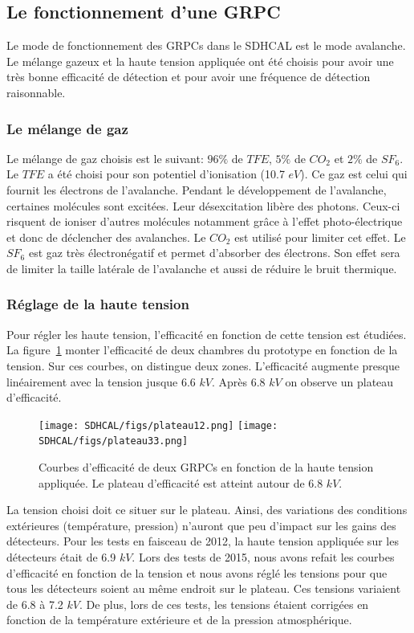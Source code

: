 \subsection{Le fonctionnement d'une GRPC}
Le mode de fonctionnement des GRPCs dans le SDHCAL est le mode avalanche. Le mélange gazeux et la haute tension appliquée ont été choisis pour avoir une très bonne efficacité de détection et pour avoir une fréquence de détection raisonnable. 
\subsubsection{Le mélange de gaz}
Le mélange de gaz choisis est le suivant: $96\%$ de $TFE$, $5\%$ de $CO_2$ et $2\%$ de $SF_6$. Le $TFE$ a été choisi pour son potentiel d'ionisation (10.7 $eV$). Ce gaz est celui qui fournit les électrons de l'avalanche. Pendant le développement de l'avalanche, certaines molécules sont excitées. Leur désexcitation libère des photons. Ceux-ci risquent de ioniser d'autres molécules notamment grâce à l'effet photo-électrique et donc de déclencher des avalanches. Le $CO_2$ est utilisé pour limiter cet effet. Le $SF_6$ est gaz très électronégatif et permet d'absorber des électrons. Son effet sera de limiter la taille latérale de l'avalanche et aussi de réduire le bruit thermique.

\subsubsection{Réglage de la haute tension}
Pour régler les haute tension, l'efficacité en fonction de cette tension est étudiées. La figure~\ref{fig:plateau} monter l'efficacité de deux chambres du prototype en fonction de la tension. Sur ces courbes, on distingue deux zones. L'efficacité augmente presque linéairement avec la tension jusque 6.6 $kV$. Après 6.8 $kV$ on observe un plateau d'efficacité. 
\begin{figure}[!h]
  \begin{center}
    \texttt{[image: SDHCAL/figs/plateau12.png]}
    \texttt{[image: SDHCAL/figs/plateau33.png]}
    \caption{Courbes d'efficacité de deux GRPCs en fonction de la haute tension appliquée. Le plateau d'efficacité est atteint autour de 6.8 $kV$.}
    \label{fig:plateau}
  \end{center}
\end{figure}
La tension choisi doit ce situer sur le plateau. Ainsi, des variations des conditions extérieures (température, pression) n'auront que peu d'impact sur les gains des détecteurs. Pour les tests en faisceau de 2012, la haute tension appliquée sur les détecteurs était de 6.9 $kV$. Lors des tests de 2015, nous avons refait les courbes d'efficacité en fonction de la tension et nous avons réglé les tensions pour que tous les détecteurs soient au même endroit sur le plateau. Ces tensions variaient de 6.8 à 7.2 $kV$. De plus, lors de ces tests, les tensions étaient corrigées en fonction de la température extérieure et de la pression atmosphérique. 

